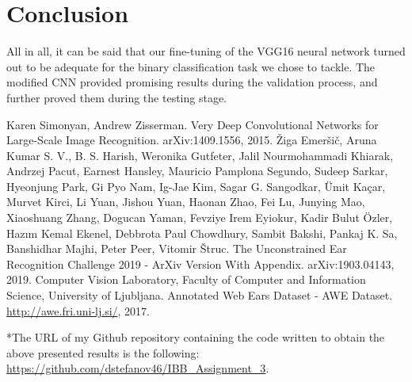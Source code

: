 \documentclass[9pt]{IEEEtran}
\begin{document}
\section{Conclusion}
All in all, it can be said that our fine-tuning of the VGG16 neural network turned out to be adequate for the binary classification task we chose to tackle. The modified CNN provided promising results during the validation process, and further proved them during the testing stage.


\begin{thebibliography}{99}
 Karen Simonyan, Andrew Zisserman. Very Deep Convolutional Networks for Large-Scale Image Recognition. arXiv:1409.1556, 2015.
 Žiga Emeršič, Aruna Kumar S. V., B. S. Harish, Weronika Gutfeter, Jalil Nourmohammadi Khiarak, Andrzej Pacut, Earnest Hansley, Mauricio Pamplona Segundo, Sudeep Sarkar, Hyeonjung Park, Gi Pyo Nam, Ig-Jae Kim, Sagar G. Sangodkar, Ümit Kaçar, Murvet Kirci, Li Yuan, Jishou Yuan, Haonan Zhao, Fei Lu, Junying Mao, Xiaoshuang Zhang, Dogucan Yaman, Fevziye Irem Eyiokur, Kadir Bulut Özler, Hazım Kemal Ekenel, Debbrota Paul Chowdhury, Sambit Bakshi, Pankaj K. Sa, Banshidhar Majhi, Peter Peer, Vitomir Štruc. The Unconstrained Ear Recognition Challenge 2019 - ArXiv Version With Appendix. arXiv:1903.04143, 2019.
 Computer Vision Laboratory, Faculty of Computer and Information Science, University of Ljubljana. Annotated Web Ears Dataset - AWE Dataset. \url{http://awe.fri.uni-lj.si/}, 2017.
\end{thebibliography}

*The URL of my Github repository containing the code written to obtain the above presented results is the following: \url{https://github.com/dstefanov46/IBB_Assignment_3}.
\end{document}
